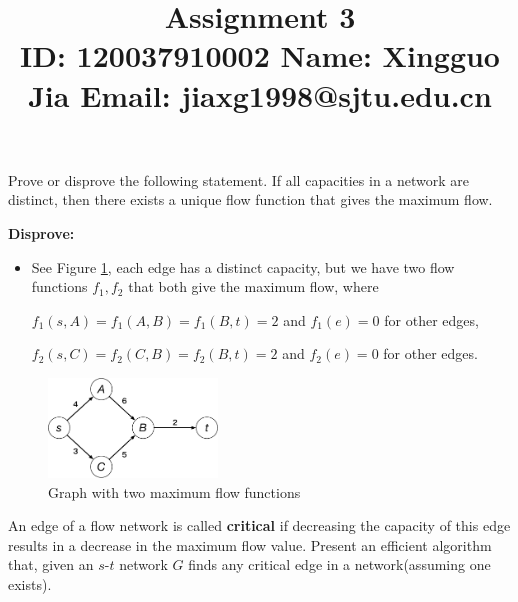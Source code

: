 \documentclass{article}
\title{{\bf Assignment 3} \\ {\large ID: 120037910002 } {\large Name: Xingguo Jia } {\large Email: jiaxg1998@sjtu.edu.cn}}
\author{}
\date{}
\newcounter{exercise}
\newcommand{\<}{
    \langle}
\renewcommand{\>}{
    \rangle}
\begin{document}
\maketitle


{\large





\begin{exercise}
Prove or disprove the following statement. If all capacities in a network are distinct,
 then there exists a unique flow function that gives the maximum flow.
\end{exercise}

\textbf{Disprove:}

\begin{itemize}
    \item See Figure \ref{a}, each edge has a distinct capacity, but we have two flow functions $f_1,f_2$ that both give the maximum flow, where

    \centering $f_1(s,A)=f_1(A,B)=f_1(B,t)=2$ and $f_1(e)=0$ for other edges,
    
    \centering $f_2(s,C)=f_2(C,B)=f_2(B,t)=2$ and $f_2(e)=0$ for other edges.
\end{itemize}

\begin{figure}[!htp]
    \centering
    \includegraphics[width=0.4\textwidth]{img/a.pdf}
    \caption{Graph with two maximum flow functions}
    \label{a}
\end{figure}

\newpage


\begin{exercise}
An edge of a flow network is called \textbf{critical} if decreasing the capacity of this edge results in a decrease in the maximum flow value. Present an efficient algorithm that, given an $s$-$t$ network $G$ finds any critical edge in a network(assuming one exists).
\end{exercise}

}
\end{document}
